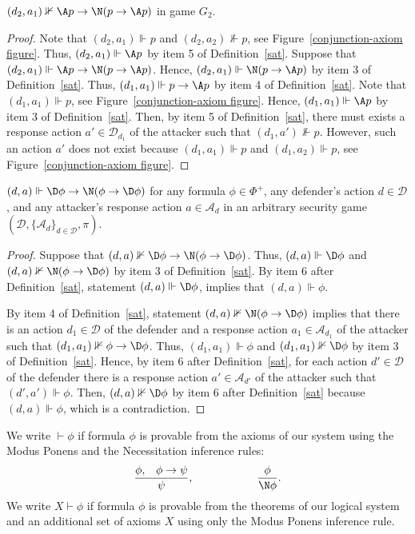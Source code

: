 \documentclass[letterpaper]{article}
\begin{document}
\begin{lemma}
$(d_2,a_1)\nVdash \A p \to \N(p\to \A p)$ in game $G_2$.
\end{lemma}
\begin{proof}
Note that $(d_2,a_1)\Vdash p$ and $(d_2,a_2)\nVdash p$, see Figure~\ref{conjunction-axiom figure}. Thus, $(d_2,a_1)\Vdash \A p$ by item 5 of Definition~\ref{sat}. Suppose that $(d_2,a_1)\Vdash \A p \to \N(p\to \A p)$. Hence, $(d_2,a_1)\Vdash \N(p\to \A p)$ by item 3 of Definition~\ref{sat}. Thus, $(d_1,a_1)\Vdash p\to \A p$ by item 4 of Definition~\ref{sat}. Note that $(d_1,a_1)\Vdash p$, see Figure~\ref{conjunction-axiom figure}. Hence, $(d_1,a_1)\Vdash \A p$ by item 3 of Definition~\ref{sat}. Then, by item 5 of Definition~\ref{sat}, there must exists a response action $a'\in\mathcal{D}_{d_1}$ of the attacker such that  $(d_1,a')\nVdash p$. However, such an action $a'$ does not exist because $(d_1,a_1)\Vdash p$ and $(d_1,a_2)\Vdash p$, see Figure~\ref{conjunction-axiom figure}.
\end{proof}

\begin{lemma}
$(d,a)\Vdash \D\phi\to\N(\phi\to\D\phi)$ for any formula $\phi\in \Phi^+$, any defender's action $d\in\mathcal{D}$, and any attacker's response action $a\in \mathcal{A}_d$ in an arbitrary security game $(\mathcal{D},\{\mathcal{A}_d\}_{d\in\mathcal{D}},\pi)$.
\end{lemma}
\begin{proof}
Suppose that $(d,a)\nVdash \D\phi\to\N(\phi\to\D\phi)$. Thus, $(d,a)\Vdash \D\phi$ and $(d,a)\nVdash \N(\phi\to\D\phi)$ by item 3 of Definition~\ref{sat}. By item 6 after Definition~\ref{sat}, statement $(d,a)\Vdash \D\phi$, implies that $(d,a)\Vdash\phi$.

By item 4 of  Definition~\ref{sat}, statement $(d,a)\nVdash \N(\phi\to\D\phi)$ implies that there is an action $d_1\in\mathcal{D}$ of the defender and a response action $a_1\in\mathcal{A}_{d_1}$ of the attacker such that $(d_1,a_1)\nVdash \phi\to\D\phi$. Thus, $(d_1,a_1)\Vdash \phi$ and $(d_1,a_1)\nVdash \D\phi$ by item 3 of  Definition~\ref{sat}. Hence, by item 6 after Definition~\ref{sat}, for each action $d'\in\mathcal{D}$ of the defender there is a response action $a'\in\mathcal{A}_{d'}$ of the attacker such that $(d',a')\Vdash \phi$. Then, $(d,a)\nVdash \D\phi$ by item 6 after Definition~\ref{sat} because $(d,a)\Vdash \phi$, which is a contradiction.
\end{proof}

We write $\vdash\phi$ if formula $\phi$ is provable from the axioms of our system using the Modus Ponens and
the Necessitation inference rules:
$$
\dfrac{\phi,\;\;\;\phi\to\psi}{\psi},
\hspace{20mm}
\dfrac{\phi}{\N\phi}.
$$
We write $X\vdash\phi$ if formula $\phi$ is provable from the theorems of our logical system and an additional set of axioms $X$ using only the Modus Ponens inference rule.
\end{document}
